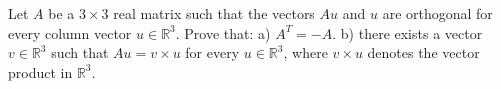 Let $A$ be a $3\times 3$ real matrix such that the vectors $Au$ and $u$ are orthogonal for
every column vector $u\in \mathbb{R}^{3}$. Prove that:
a) $A^{T}=-A$.
b) there exists a vector $v \in \mathbb{R}^{3}$ such that $Au=v\times u$ for every $u\in \mathbb{R}^{3}$,
where $v \times u$ denotes the vector product in $\mathbb{R}^{3}$.
